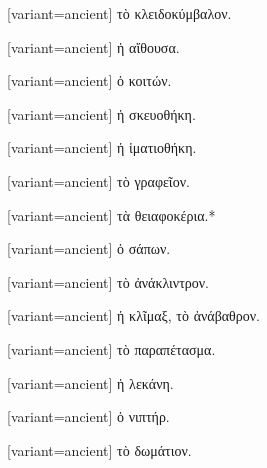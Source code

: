 \switchcolumn*
{}%
\switchcolumn
\begin{greek}[variant=ancient]%
τὸ κλειδοκύμβαλον.%
\end{greek}%
\switchcolumn*
{}%
\switchcolumn
\begin{greek}[variant=ancient]%
ἡ αἴθουσα.%
\end{greek}%
\switchcolumn*
{}%
\switchcolumn
\begin{greek}[variant=ancient]%
ὁ κοιτών.%
\end{greek}%
\switchcolumn*
{}%
\switchcolumn
\begin{greek}[variant=ancient]%
ἡ σκευοθήκη.%
\end{greek}%
\switchcolumn*
{}%
\switchcolumn
\begin{greek}[variant=ancient]%
ἡ ἱματιοθήκη.%
\end{greek}%
\switchcolumn*
{}%
\switchcolumn
\begin{greek}[variant=ancient]%
τὸ γραφεῖον.%
\end{greek}%
\switchcolumn*
{}%
\switchcolumn
\begin{greek}[variant=ancient]%
τὰ θειαφοκέρια.{*}%
\end{greek}%
\switchcolumn*
{}%
\switchcolumn
\begin{greek}[variant=ancient]%
ὁ σάπων.%
\end{greek}%
\switchcolumn*
{}%
\switchcolumn
\begin{greek}[variant=ancient]%
τὸ ἀνάκλιντρον.%
\end{greek}%
\switchcolumn*
{}%
\switchcolumn
\begin{greek}[variant=ancient]%
ἡ κλῖμαξ, τὸ ἀνάβαθρον.%
\end{greek}%
\switchcolumn*
{}%
\switchcolumn
\begin{greek}[variant=ancient]%
τὸ παραπέτασμα.%
\end{greek}%
\switchcolumn*
{}%
\switchcolumn
\begin{greek}[variant=ancient]%
ἡ λεκάνη.%
\end{greek}%
\switchcolumn*
{}%
\switchcolumn
\begin{greek}[variant=ancient]%
ὁ νιπτήρ.%
\end{greek}%
\switchcolumn*
{}%
\switchcolumn
\begin{greek}[variant=ancient]%
τὸ δωμάτιον.%
\end{greek}%
